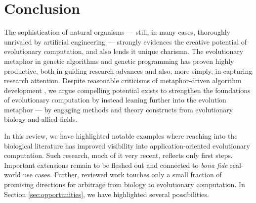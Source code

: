 
\section{Conclusion} \label{sec:conclusion}

The sophistication of natural organisms --- still, in many cases, thoroughly unrivaled by artificial engineering --- strongly evidences the creative potential of evolutionary computation, and also lends it unique charisma.
The evolutionary metaphor in genetic algorithms and genetic programming has proven highly productive, both in guiding research advances and also, more simply, in capturing research attention.
Despite reasonable criticisms of metaphor-driven algorithm development \citep{moore2023evolution,sorensen2015metaheuristics}, we argue compelling potential exists to strengthen the foundations of evolutionary computation by instead leaning further into the evolution metaphor --- by engaging methods and theory constructs from evolutionary biology and allied fields.

In this review, we have highlighted notable examples where reaching into the biological literature has improved visibility into application-oriented evolutionary computation.
Such research, much of it very recent, reflects only first steps.
Important extensions remain to be fleshed out and connected to \textit{bona fide} real-world use cases.
Further, reviewed work touches only a small fraction of promising directions for arbitrage from biology to evolutionary computation.
In Section \ref{sec:opportunities}, we have highlighted several possibilities.


